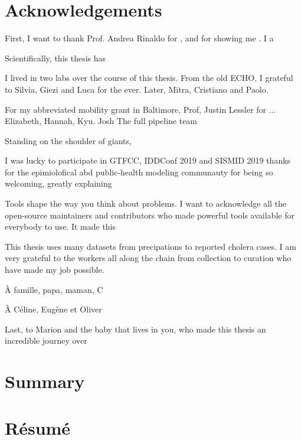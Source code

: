  \chapter{Acknowledgements}
 
 First, I want to thank Prof. Andrea Rinaldo for , and for showing me . I a
 
 Scientifically, this thesis has
 
 I lived in two labs over the course of this thesis. From the old ECHO, I grateful to Silvia, Giezi and Luca for the ever. Later, Mitra, Cristiano and Paolo.
 
 For my abbreviated mobility grant in Baltimore, Prof, Justin Lessler for ... Elizabeth, Hannah, Kyu. Josh The full pipeline team
 
 
Standing on the shoulder of giants, 

I was lucky to participate in GTFCC, IDDConf 2019 and SISMID 2019 thanks for the epimiolofical abd public-health modeling communauty for being so welcoming, greatly explaining

Tools shape the way you think about problems. I want to acknowledge all the open-source maintainers and contributors who made powerful tools available for everybody to use. It made this  

This thesis uses many datasets from precipations to reported cholera cases. I am very grateful to the workers all along the chain from collection to curation who have made my job possible.

À famille, papa, maman, C

À Céline, Eugène et Oliver %

Last, to Marion and the baby that lives in you, who made this thesis an incredible journey over 
 
 \chapter{Summary}
 
 \chapter{Résumé}